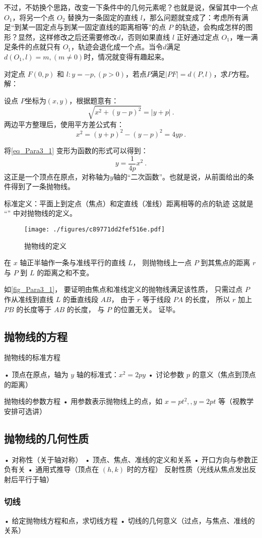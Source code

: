 不过，不妨换个思路，改变一下条件中的几何元素呢？也就是说，保留其中一个点 $O_1$，将另一个点 $O_2$ 替换为一条固定的直线 $l$，那么问题就变成了：考虑所有满足“到某一固定点与到某一固定直线的距离相等”的点 $P$ 的轨迹，会构成怎样的图形？显然，这样修改之后还需要修改$d$，否则如果直线 $l$ 正好通过定点 $O_1$，唯一满足条件的点就只有 $O_1$，轨迹会退化成一个点。当令$d$满足 $d(O_1,l)=m,(m\neq0)$时，情况就变得有趣起来。

\begin{example}{对定点 $F(0, p)$ 和 $l:y=-p,(p>0)$，若点$P$满足$|PF|=d(P,l)$，求$P$方程。}
解：

设点 $P$坐标为$(x, y)$，根据题意有：
\begin{equation}
\sqrt{x^2+(y-p)^2}=|y +p|~.
\end{equation}
两边平方整理后，使用平方差公式有：
\begin{equation}\label{eq_Para3_1}
x^2=(y+p)^2-(y-p)^2=4yp~.
\end{equation}
\end{example}

将\autoref{eq_Para3_1} 变形为函数的形式可以得到：
\begin{equation}
y=\frac{1}{4p}x^2~.
\end{equation}
这正是一个顶点在原点，对称轴为$y$轴的“二次函数”。也就是说，从前面给出的条件得到了一条抛物线。

标准定义：平面上到定点（焦点）和定直线（准线）距离相等的点的轨迹
这就是 “” 中对抛物线的定义。
\begin{figure}[ht]
\centering
\texttt{[image: ./figures/c89771dd2fef516e.pdf]}
\caption{抛物线的定义} \label{fig_Para3_1}
\end{figure}

在 $x$ 轴正半轴作一条与准线平行的直线 $L$， 则抛物线上一点 $P$ 到其焦点的距离 $r$ 与 $P$ 到 $L$ 的距离之和不变。

如\autoref{fig_Para3_1}， 要证明由焦点和准线定义的抛物线满足该性质， 只需过点 $P$ 作从准线到直线 $L$ 的垂直线段 $AB$， 由于 $r$ 等于线段 $PA$ 的长度， 所以 $r$ 加上 $PB$ 的长度等于 $AB$ 的长度， 与 $P$ 的位置无关。 证毕。


\subsection{抛物线的方程}

\begin{theorem}{抛物线的标准方程}

\end{theorem}
	•	顶点在原点，轴为 $y$ 轴的标准式：$x^2=2py$
	•	讨论参数 $p$ 的意义（焦点到顶点的距离）
\begin{theorem}{抛物线的参数方程}
	•	用参数表示抛物线上的点，如 $x=pt^2,,y=2pt$ 等（视教学安排可选讲）
\end{theorem}

\subsection{抛物线的几何性质}
	•	对称性（关于轴对称）
	•	顶点、焦点、准线的定义和关系
	•	开口方向与参数正负有关
	•	通用式推导（顶点在 $(h,k)$ 时的方程）
    反射性质（光线从焦点发出反射后平行于轴）
\subsubsection{切线}
	•	给定抛物线方程和点，求切线方程
	•	切线的几何意义（过点，与焦点、准线的关系）
